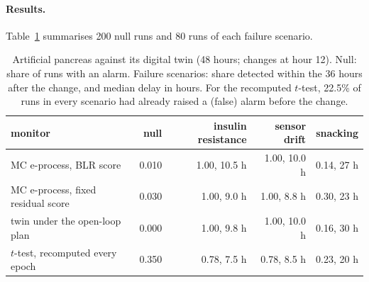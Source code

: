 \documentclass[11pt]{article}
\theoremstyle{remark}
\begin{document}
\paragraph{Results.} Table~\ref{tab:t1d} summarises 200 null runs and 80 runs
of each failure scenario.

\begin{table}[t]
\centering
\caption{Artificial pancreas against its digital twin (48 hours; changes at
hour 12). Null: share of runs with an alarm. Failure scenarios: share
detected within the 36 hours after the change, and median delay in hours.
For the recomputed $t$-test, 22.5\% of runs in every scenario had already
raised a (false) alarm before the change.}
\label{tab:t1d}
\begin{tabular}{lrrrr}
\toprule
monitor & null & insulin resistance & sensor drift & snacking \\
\midrule
MC e-process, BLR score & 0.010 & 1.00, 10.5 h & 1.00, 10.0 h & 0.14, 27 h \\
MC e-process, fixed residual score & 0.030 & 1.00, 9.0 h & 1.00, 8.8 h & 0.30, 23 h \\
twin under the open-loop plan & 0.000 & 1.00, 9.8 h & 1.00, 10.0 h & 0.16, 30 h \\
$t$-test, recomputed every epoch & 0.350 & 0.78, 7.5 h & 0.78, 8.5 h & 0.23, 20 h \\
\bottomrule
\end{tabular}
\end{table}
\end{document}
